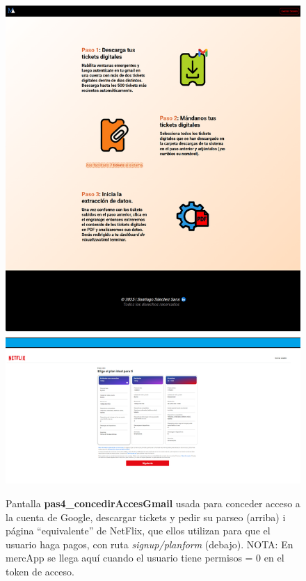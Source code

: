 \documentclass[a4paper,12pt]{report}
\begin{document}
	\FloatBarrier
	\setlength{\belowcaptionskip}{3pt}
	\begin{figure}[H]
		\centering
		\caption{Pantalla \textbf{pas4\_concedirAccesGmail} usada para conceder acceso a la cuenta de Google, descargar tickets y pedir su parseo (arriba) i página ``equivalente'' de NetFlix, que ellos utilizan para que el usuario haga pagos, con ruta \textit{signup/planform} (debajo). NOTA: En mercApp se llega aquí cuando el usuario tiene permisos = 0 en el token de acceso.}
		\includegraphics[width=.9\linewidth]{img/concedirAccesGmail}
		\label{fig:concedirAccesGmail}
	\end{figure}
	\FloatBarrier
\end{document}
